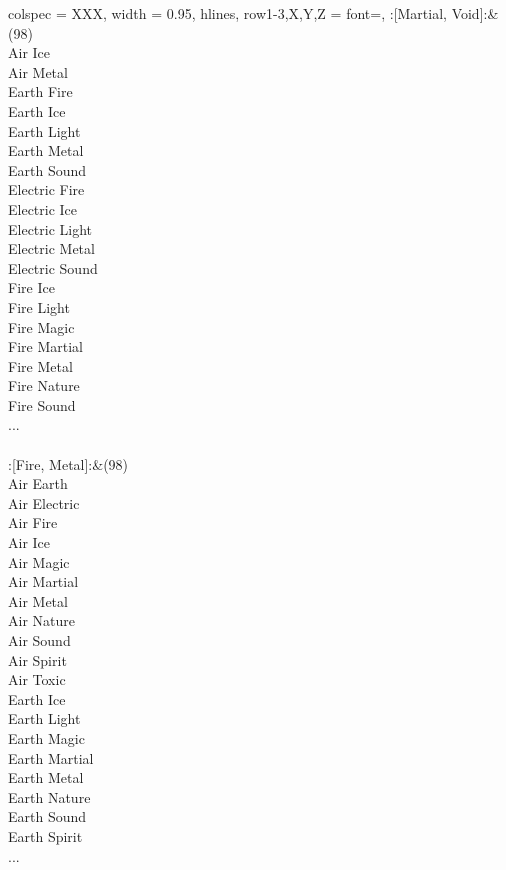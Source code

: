 \begin{longtblr}[
	caption = {2v2 Defending Weak},
	label = {2v2-Defending-Weak},
]{
	colspec = {XXX}, width = 0.95\linewidth,
	hlines,
	row{1-3,X,Y,Z} = {font=\bfseries},
}
	:[Martial, Void]:&{(98)\\
	Air Ice \\
	Air Metal \\
	Earth Fire \\
	Earth Ice \\
	Earth Light \\
	Earth Metal \\
	Earth Sound \\
	Electric Fire \\
	Electric Ice \\
	Electric Light \\
	Electric Metal \\
	Electric Sound \\
	Fire Ice \\
	Fire Light \\
	Fire Magic \\
	Fire Martial \\
	Fire Metal \\
	Fire Nature \\
	Fire Sound \\
	...\\
	}\\

	:[Fire, Metal]:&{(98)\\
	Air Earth \\
	Air Electric \\
	Air Fire \\
	Air Ice \\
	Air Magic \\
	Air Martial \\
	Air Metal \\
	Air Nature \\
	Air Sound \\
	Air Spirit \\
	Air Toxic \\
	Earth Ice \\
	Earth Light \\
	Earth Magic \\
	Earth Martial \\
	Earth Metal \\
	Earth Nature \\
	Earth Sound \\
	Earth Spirit \\
	...\\
	}\\


\end{longtblr}
